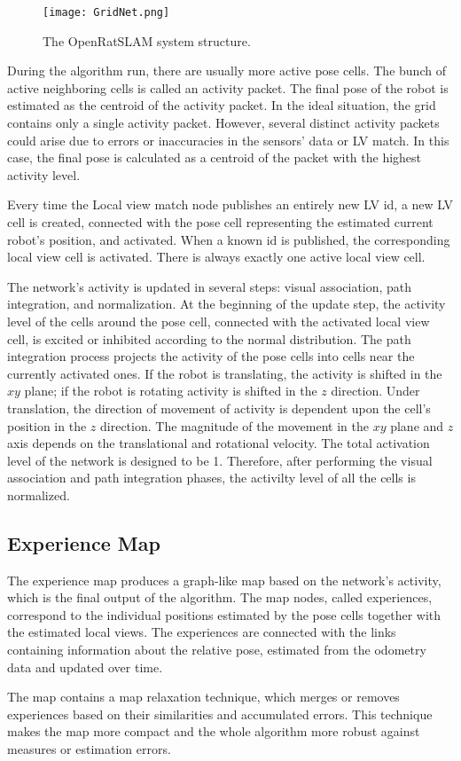 \begin{figure}[htpb]
    \centering
    \texttt{[image: GridNet.png]}
    \caption{The OpenRatSLAM system structure. \cite{RatSLAMExp3}} \label{fig:ratSlam}
\end{figure}

During the algorithm run, there are usually more active pose cells. The bunch of active neighboring cells is called an activity packet. The final pose of the robot is estimated as the centroid of the activity packet. In the ideal situation, the grid contains only a single activity packet. However, several distinct activity packets could arise due to errors or inaccuracies in the sensors' data or LV match. In this case, the final pose is calculated as a centroid of the packet with the highest activity level.\par
Every time the Local view match node publishes an entirely new LV id, a new LV cell is created, connected with the pose cell representing the estimated current robot's position, and activated. When a known id is published, the corresponding local view cell is activated. There is always exactly one active local view cell.\par
The network's activity is updated in several steps: visual association, path integration, and normalization. At the beginning of the update step, the activity level of the cells around the pose cell, connected with the activated local view cell, is excited or inhibited according to the normal distribution. The path integration process projects the activity of the pose cells into cells near the currently activated ones. If the robot is translating, the activity is shifted in the $xy$ plane; if the robot is rotating activity is shifted in the $z$ direction. Under translation, the direction of movement of activity is dependent upon the cell's position in the $z$ direction. The magnitude of the movement in the $xy$ plane and $z$ axis depends on the translational and rotational velocity.\cite{RatSLAM} The total activation level of the network is designed to be 1. Therefore, after performing the visual association and path integration phases, the activilty level of all the cells is normalized.

\subsection{Experience Map}\label{section:expMap}

The experience map produces a graph-like map based on the network's activity, which is the final output of the algorithm. The map nodes, called experiences, correspond to the individual positions estimated by the pose cells together with the estimated local views. The experiences are connected with the links containing information about the relative pose, estimated from the odometry data and updated over time.\par
The map contains a map relaxation technique, which merges or removes experiences based on their similarities and accumulated errors. This technique makes the map more compact and the whole algorithm more robust against measures or estimation errors.
